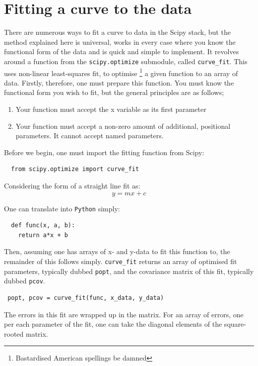 \documentclass{article}
\begin{document}
\section{Fitting a curve to the data}
There are numerous ways to fit a curve to data in the Scipy stack, but
the method explained here is universal, works in every case where you
know the functional form of the data and is quick and simple to
implement. It revolves around a function from the
\texttt{scipy.optimize} submodule, called \texttt{curve\_fit}. This
uses non-linear least-squares fit, to optimise \footnote{Bastardised
  American spellings be damned} a given function to an array of
data. Firstly, therefore, one must prepare this function. You must
know the functional form you wish to fit, but the general principles
are as follows;

\begin{enumerate}
\item Your function must accept the x variable as its first parameter
\item Your function must accept a non-zero amount of additional,
  positional parameters. It cannot accept named parameters.
\end{enumerate}

Before we begin, one must import the fitting function from Scipy:

\begin{lstlisting}
  from scipy.optimize import curve_fit
\end{lstlisting}

Considering the form of a straight line fit as:
\begin{equation}
  \label{eq:slf}
  y = mx + c
\end{equation}

One can translate into \texttt{Python} simply:
\begin{lstlisting}
  def func(x, a, b):
    return a*x + b
\end{lstlisting}

Then, assuming one has arrays of x- and y-data to fit this function
to, the remainder of this follows simply. \texttt{curve\_fit} returns
an array of optimised fit parameters, typically dubbed \texttt{popt},
and the covariance matrix of this fit, typically dubbed \texttt{pcov}.

\begin{lstlisting}
 popt, pcov = curve_fit(func, x_data, y_data) 
\end{lstlisting}

The errors in this fit are wrapped up in the matrix. For an array of
errors, one per each parameter of the fit, one can take the diagonal
elements of the square-rooted matrix.
\end{document}
